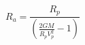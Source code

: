 \begin{equation*}
R_{a} = \frac{R_{p}}{\left(\frac{2GM}{R_{p}V_{p}^{2}} - 1 \right)} \tag{4.18}
\end{equation*}
